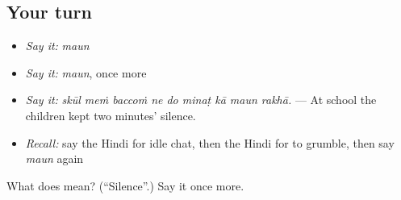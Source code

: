 \subsection*{Your turn}
\begin{itemize}
\raggedright
  \item \emph{Say it:} \emph{maun}
  \item \emph{Say it:} \emph{maun}, once more
  \item \emph{Say it:} \emph{skūl meṁ baccoṁ ne do minaṭ kā maun rakhā.} — At school the children kept two minutes' silence.
  \item \emph{Recall:} say the Hindi for idle chat, then the Hindi for to grumble, then say \emph{maun} again
\end{itemize}

\begin{tcolorbox}[breakable,colback=teal!4,colframe=teal!35!black,title={Before you move on}]
What does  mean? (\textquotedblleft{}Silence\textquotedblright{}.) Say it once more.
\end{tcolorbox}
